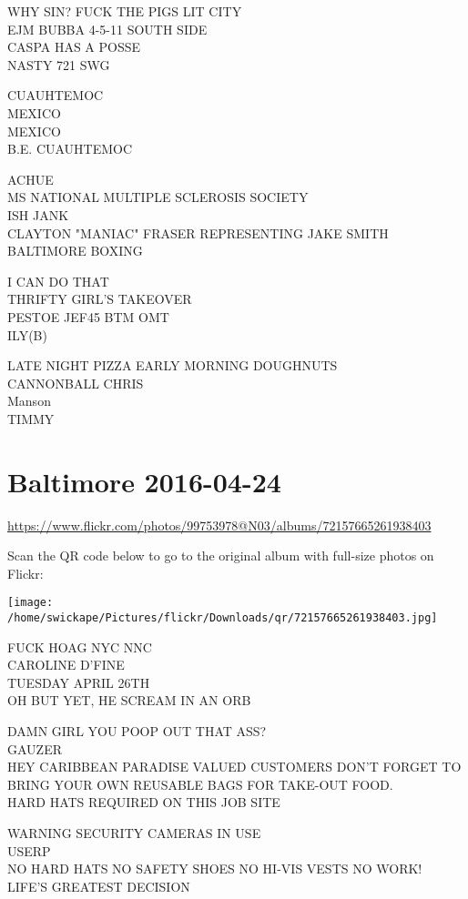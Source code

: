 \documentclass[10pt,letterpaper]{article}
\begin{document}
WHY SIN?  FUCK THE PIGS LIT CITY\\
EJM BUBBA 4{-}5{-}11 SOUTH SIDE\\
CASPA HAS A POSSE\\
NASTY 721 SWG

CUAUHTEMOC\\
MEXICO\\
MEXICO\\
B.E. CUAUHTEMOC

ACHUE\\
MS NATIONAL MULTIPLE SCLEROSIS SOCIETY\\
ISH JANK\\
CLAYTON "MANIAC" FRASER REPRESENTING JAKE SMITH BALTIMORE BOXING

I CAN DO THAT\\
THRIFTY GIRL'S TAKEOVER\\
PESTOE JEF45 BTM OMT\\
ILY(B)

LATE NIGHT PIZZA EARLY MORNING DOUGHNUTS\\
CANNONBALL CHRIS\\
Manson\\
TIMMY


\section*{Baltimore 2016-04-24}

\url{https://www.flickr.com/photos/99753978@N03/albums/72157665261938403}

Scan the QR code below to go to the original album with full-size photos on Flickr:

\texttt{[image: /home/swickape/Pictures/flickr/Downloads/qr/72157665261938403.jpg]}


FUCK HOAG NYC NNC\\
CAROLINE D'FINE\\
TUESDAY APRIL 26TH\\
OH BUT YET, HE SCREAM IN AN ORB

DAMN GIRL YOU POOP OUT THAT ASS?\\
GAUZER\\
HEY CARIBBEAN PARADISE VALUED CUSTOMERS DON'T FORGET TO BRING YOUR OWN REUSABLE BAGS FOR TAKE{-}OUT FOOD.\\
HARD HATS REQUIRED ON THIS JOB SITE

WARNING SECURITY CAMERAS IN USE\\
USERP\\
NO HARD HATS NO SAFETY SHOES NO HI{-}VIS VESTS NO WORK!\\
LIFE'S GREATEST DECISION
\end{document}
